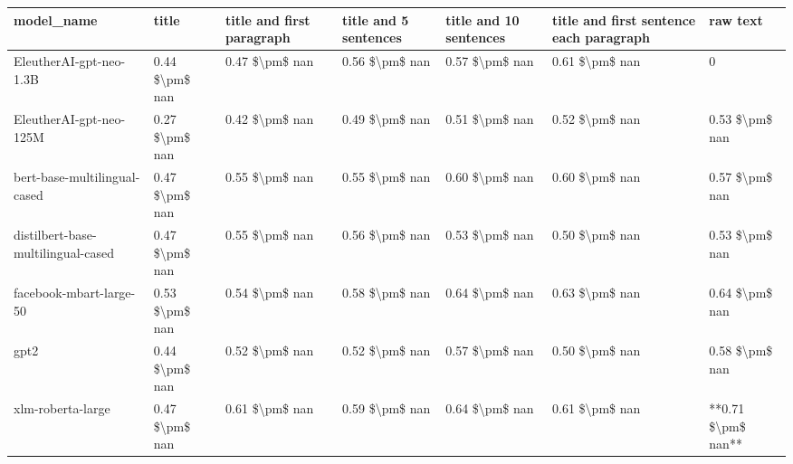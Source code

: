 \begin{tabular}{lllllll}
\toprule
                        model\_name &          title & title and first paragraph & title and 5 sentences & title and 10 sentences & title and first sentence each paragraph &           raw text \\
\midrule
           EleutherAI-gpt-neo-1.3B & 0.44 \$\textbackslash pm\$ nan &            0.47 \$\textbackslash pm\$ nan &        0.56 \$\textbackslash pm\$ nan &         0.57 \$\textbackslash pm\$ nan &                          0.61 \$\textbackslash pm\$ nan &                  0 \\
           EleutherAI-gpt-neo-125M & 0.27 \$\textbackslash pm\$ nan &            0.42 \$\textbackslash pm\$ nan &        0.49 \$\textbackslash pm\$ nan &         0.51 \$\textbackslash pm\$ nan &                          0.52 \$\textbackslash pm\$ nan &     0.53 \$\textbackslash pm\$ nan \\
      bert-base-multilingual-cased & 0.47 \$\textbackslash pm\$ nan &            0.55 \$\textbackslash pm\$ nan &        0.55 \$\textbackslash pm\$ nan &         0.60 \$\textbackslash pm\$ nan &                          0.60 \$\textbackslash pm\$ nan &     0.57 \$\textbackslash pm\$ nan \\
distilbert-base-multilingual-cased & 0.47 \$\textbackslash pm\$ nan &            0.55 \$\textbackslash pm\$ nan &        0.56 \$\textbackslash pm\$ nan &         0.53 \$\textbackslash pm\$ nan &                          0.50 \$\textbackslash pm\$ nan &     0.53 \$\textbackslash pm\$ nan \\
           facebook-mbart-large-50 & 0.53 \$\textbackslash pm\$ nan &            0.54 \$\textbackslash pm\$ nan &        0.58 \$\textbackslash pm\$ nan &         0.64 \$\textbackslash pm\$ nan &                          0.63 \$\textbackslash pm\$ nan &     0.64 \$\textbackslash pm\$ nan \\
                              gpt2 & 0.44 \$\textbackslash pm\$ nan &            0.52 \$\textbackslash pm\$ nan &        0.52 \$\textbackslash pm\$ nan &         0.57 \$\textbackslash pm\$ nan &                          0.50 \$\textbackslash pm\$ nan &     0.58 \$\textbackslash pm\$ nan \\
                 xlm-roberta-large & 0.47 \$\textbackslash pm\$ nan &            0.61 \$\textbackslash pm\$ nan &        0.59 \$\textbackslash pm\$ nan &         0.64 \$\textbackslash pm\$ nan &                          0.61 \$\textbackslash pm\$ nan & **0.71 \$\textbackslash pm\$ nan** \\
\bottomrule
\end{tabular}
